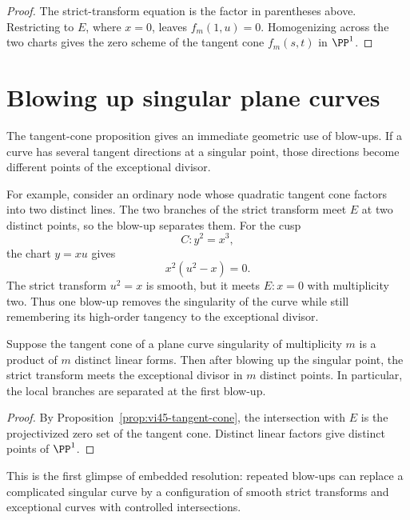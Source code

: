 \begin{proof}
The strict-transform equation is the factor in parentheses above.  Restricting to \(E\), where \(x=0\), leaves \(f_m(1,u)=0\).  Homogenizing across the two charts gives the zero scheme of the tangent cone \(f_m(s,t)\) in \(\PP^1\).
\end{proof}



\section{Blowing up singular plane curves}

The tangent-cone proposition gives an immediate geometric use of blow-ups.  If a curve has several tangent directions at a singular point, those directions become different points of the exceptional divisor.

For example, consider an ordinary node whose quadratic tangent cone factors into two distinct lines.  The two branches of the strict transform meet \(E\) at two distinct points, so the blow-up separates them.  For the cusp
\[
  C:y^2=x^3,
\]
the chart \(y=xu\) gives
\[
  x^2(u^2-x)=0.
\]
The strict transform \(u^2=x\) is smooth, but it meets \(E:x=0\) with multiplicity two.  Thus one blow-up removes the singularity of the curve while still remembering its high-order tangency to the exceptional divisor.

\begin{proposition}
Suppose the tangent cone of a plane curve singularity of multiplicity \(m\) is a product of \(m\) distinct linear forms.  Then after blowing up the singular point, the strict transform meets the exceptional divisor in \(m\) distinct points.  In particular, the local branches are separated at the first blow-up.
\end{proposition}

\begin{proof}
By Proposition~\ref{prop:vi45-tangent-cone}, the intersection with \(E\) is the projectivized zero set of the tangent cone.  Distinct linear factors give distinct points of \(\PP^1\).
\end{proof}

This is the first glimpse of embedded resolution: repeated blow-ups can replace a complicated singular curve by a configuration of smooth strict transforms and exceptional curves with controlled intersections.

